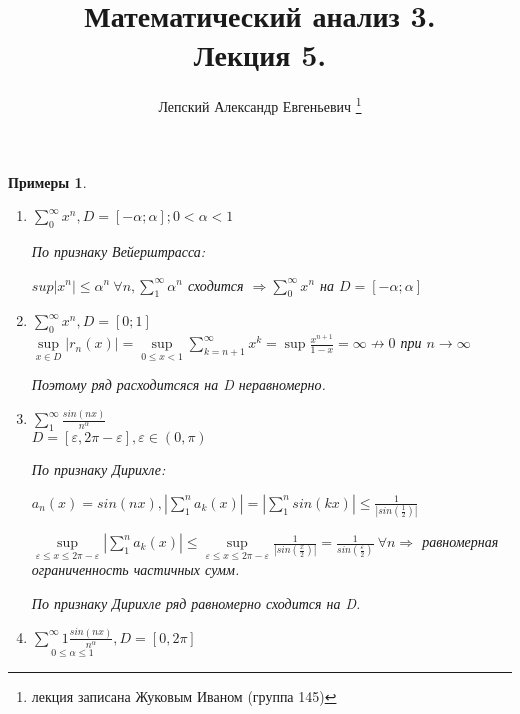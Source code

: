 \documentclass[a4paper, 12pt]{article}
\title{\vspace{-2.0cm}Математический анализ 3.\\Лекция 5.}
\author{Лепский Александр Евгеньевич
        \footnote{лекция записана Жуковым Иваном (группа 145)}}
\newtheorem{Examples}{Примеры}
\begin{document}
    \maketitle

    \begin{Examples}
    \leavevmode
        \begin{enumerate}
            \item
                \(\sum^{\infty}_{0} x^n, D =[-\alpha; \alpha]; 0 < \alpha < 1\)

                По признаку Вейерштрасса:

                \( sup \left| x^n \right|  \le \alpha^n \ \forall n, 
                \sum^{\infty}_{1} \alpha^n\) сходится \( \Rightarrow
                \sum^{\infty}_{0} x^n\) на \(D = [-\alpha; \alpha]\)
            \item
                \( \sum^{\infty}_{0} x^n, D = [0; 1] \) \\
                \( \underset{x \in D}{\sup} \left| r_n(x) \right| =
                \underset{0 \le x < 1}{\sup} \sum^{\infty}_{k = n + 1} 
                x^k = \sup \frac{x ^ {n + 1}}{1 - x}
                = \infty \not \rightarrow 0\) при \(n \rightarrow \infty\)

                Поэтому ряд расходитсяся на D неравномерно.

            \item
                \( \sum^{\infty}_{1} \frac{sin(nx)}{n ^ \alpha}\) \\
                \( D = [\varepsilon, 2\pi - \varepsilon], \varepsilon
                \in (0, \pi)\)

                По признаку Дирихле:

                \( a_n(x) = sin(nx), \left| \sum^{n}_{1} a_k(x) \right| =
                \left| \sum^{n}_{1}sin(kx) \right|
                \le \frac{1}{\left| sin(\frac{1}{2}) \right|}\)

                \( \underset{\varepsilon \le x \le 2\pi - \varepsilon}{\sup} 
                \left| \sum^{n}_{1} a_k(x) \right| \le
                \underset{\varepsilon \le x \le 2\pi - \varepsilon}{\sup}
                \frac{1}{\left| sin(\frac{x}{2}) \right|} =
                \frac{1}{sin(\frac{\varepsilon}{2})} \ \forall n \Rightarrow\)
                равномерная ограниченность частичных сумм.

                По признаку Дирихле ряд равномерно сходится на D.

            \item
                \( \underset{0 \le \alpha \le 1}{\sum^{\infty}{1}
                \frac{sin(nx)}{n ^ \alpha}}, D = [0, 2\pi]\)


\end{enumerate}
\end{Examples}
\end{document}
